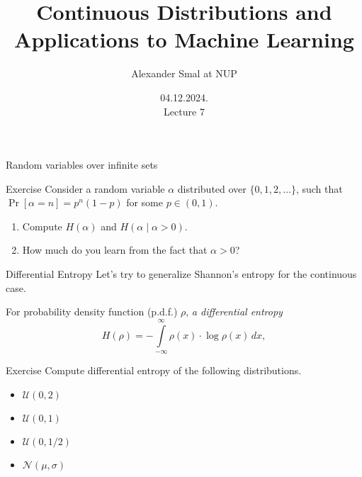 \documentclass[aspectratio=169]{beamer}
\title{Continuous Distributions and Applications to Machine Learning}
\author{Alexander Smal at NUP}
\date{04.12.2024.\\ Lecture 7}
\begin{document}
\begin{frame}[plain]
    \maketitle
\end{frame}

\begin{frame}{Random variables over infinite sets}
    \begin{block}{Exercise}
         Consider a random variable $\alpha$ distributed over $\{0,1,2,\dotsc\}$,
        such that $\Pr[\alpha = n] = p^n (1-p)$ for some $p\in(0,1)$.
        \begin{enumerate}
            \item Compute $H(\alpha)$ and $H(\alpha\mid \alpha>0)$.
            \item How much do you learn from the fact that $\alpha > 0$?
        \end{enumerate}
    \end{block}
    \vspace{5cm}
\end{frame}



\begin{frame}{Differential Entropy}
Let's try to generalize Shannon's entropy for the continuous case.

For probability density function (p.d.f.) $\rho$, \emph{a differential entropy}
\[
H(\rho) = -\int\limits_{-\infty}^{\infty} \rho(x)\cdot\log \rho(x)\,dx,
\]

\begin{block}{Exercise}
    Compute differential entropy of the following distributions.
    \begin{itemize}
        \item $\mathcal{U}(0,2)$
        \item $\mathcal{U}(0,1)$
        \item $\mathcal{U}(0,1/2)$
        \item $\mathcal{N}(\mu,\sigma)$
    \end{itemize}
\end{block}

\end{frame}
\end{document}
